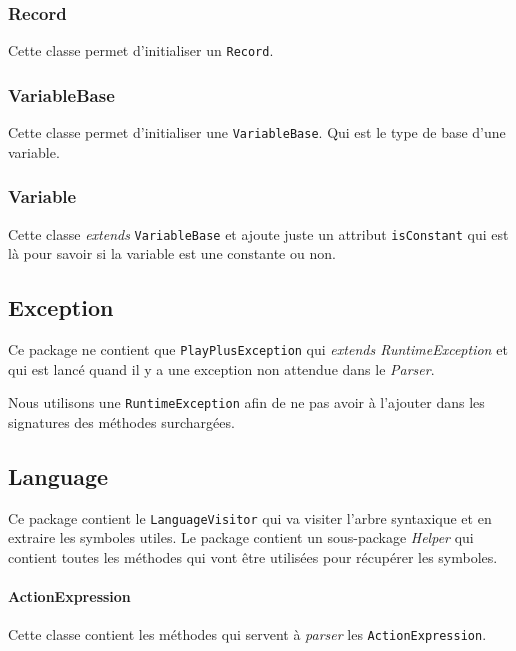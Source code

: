 \subsubsection{Record}

Cette classe permet d'initialiser un \texttt{Record}.

\subsubsection{VariableBase}

Cette classe permet d'initialiser une \texttt{VariableBase}. Qui est le type de base d'une variable.

\subsubsection{Variable}

Cette classe \emph{extends} \texttt{VariableBase} et ajoute juste un attribut \texttt{isConstant} qui est là pour savoir si la variable est une constante ou non.

\subsection{Exception}

Ce package ne contient que \texttt{PlayPlusException} qui \emph{extends RuntimeException} et qui est lancé quand il y a une exception non attendue dans le \emph{Parser}.

Nous utilisons une \texttt{RuntimeException} afin de ne pas avoir à l'ajouter dans les signatures des méthodes surchargées.

\subsection{Language}

Ce package contient le \texttt{LanguageVisitor} qui va visiter l'arbre syntaxique et en extraire les symboles utiles. Le package contient un sous-package \emph{Helper} qui contient toutes les méthodes qui vont
être utilisées pour récupérer les symboles.

\paragraph{ActionExpression}

Cette classe contient les méthodes qui servent à \emph{parser} les \texttt{ActionExpression}.

